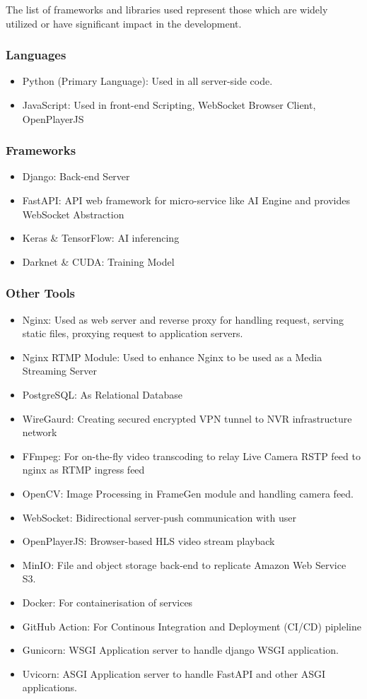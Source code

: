 The list of frameworks and libraries used represent those which are widely utilized or have significant impact in the development.

\subsubsection*{Languages}
\begin{itemize}
	\item Python (Primary Language): Used in all server-side code.
	\item JavaScript: Used in front-end Scripting, WebSocket Browser Client, OpenPlayerJS
\end{itemize}

\subsubsection*{Frameworks}
\begin{itemize}
	\item Django: Back-end Server
	\item FastAPI: API web framework for micro-service like AI Engine and provides WebSocket Abstraction
	\item Keras \& TensorFlow: AI inferencing
	\item Darknet \& CUDA: Training Model
\end{itemize}

\subsubsection*{Other Tools}
\begin{itemize}
	\item Nginx: Used as web server and reverse proxy for handling request, serving static files, proxying request to application servers.
	\item Nginx RTMP Module: Used to enhance Nginx to be used as a Media Streaming Server
	\item PostgreSQL: As Relational Database
	\item WireGaurd: Creating secured encrypted VPN tunnel to NVR infrastructure network
	\item FFmpeg: For on-the-fly video transcoding to relay Live Camera RSTP feed to nginx as RTMP ingress feed
	\item OpenCV: Image Processing in FrameGen module and handling camera feed.
	\item WebSocket: Bidirectional server-push communication with user
	\item OpenPlayerJS: Browser-based HLS video stream playback
	\item MinIO: File and object storage back-end to replicate Amazon Web Service S3.
	\item Docker: For containerisation of services
	\item GitHub Action: For Continous Integration and Deployment (CI/CD) pipleline
	\item Gunicorn: WSGI Application server to handle django WSGI application.
	\item Uvicorn: ASGI Application server to handle FastAPI and other ASGI applications. 
\end{itemize}